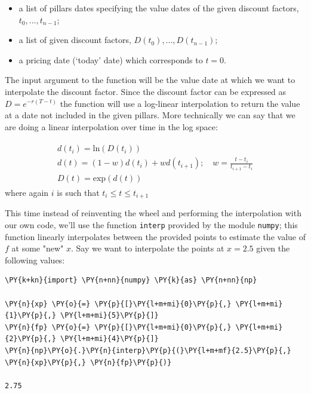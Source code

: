 \begin{itemize}
\tightlist
\item a list of pillars dates specifying the value dates of the given discount factors, \(t_0,...,t_{n-1}\);
\item a list of given discount factors, \(D(t_0),...,D(t_{n-1})\);
\item a pricing date (`today' date) which corresponds to \(t=0\).
\end{itemize}

The input argument to the function will be the value date at which we want to interpolate the discount factor. Since the discount factor can be expressed as \(D=e^{-r(T-t)}\) the function will use a log-linear interpolation to return the value at a date not included in the given pillars.
More technically we can say that we are doing a linear interpolation over time in the log space:

\begin{align}
\begin{gathered}
d(t_i)=\mathrm{ln}(D(t_i))\\
d(t) = (1-w)d(t_i) + wd(t_{i+1});\quad w=\frac{t-t_i}{t_{i+1}-t_i}\\
D(t) = \mathrm{exp}(d(t))
\end{gathered}
\end{align}
where again \(i\) is such that \(t_i \le t \le t_{i+1}\)

This time instead of reinventing the wheel and performing the interpolation with our own code, we'll use the function \texttt{interp} provided by the module \texttt{numpy}; this function linearly interpolates between the provided points to estimate the value of $f$ at some "new" $x$.
Say we want to interpolate the points at $x = 2.5$ given the following values:

\begin{tcolorbox}[breakable, size=fbox, boxrule=1pt, pad at break*=1mm,colback=cellbackground, colframe=cellborder]
\begin{Verbatim}[commandchars=\\\{\}]
\PY{k+kn}{import} \PY{n+nn}{numpy} \PY{k}{as} \PY{n+nn}{np}

\PY{n}{xp} \PY{o}{=} \PY{p}{[}\PY{l+m+mi}{0}\PY{p}{,} \PY{l+m+mi}{1}\PY{p}{,} \PY{l+m+mi}{5}\PY{p}{]}
\PY{n}{fp} \PY{o}{=} \PY{p}{[}\PY{l+m+mi}{0}\PY{p}{,} \PY{l+m+mi}{2}\PY{p}{,} \PY{l+m+mi}{4}\PY{p}{]}
\PY{n}{np}\PY{o}{.}\PY{n}{interp}\PY{p}{(}\PY{l+m+mf}{2.5}\PY{p}{,} \PY{n}{xp}\PY{p}{,} \PY{n}{fp}\PY{p}{)}

2.75
\end{Verbatim}
\end{tcolorbox}

